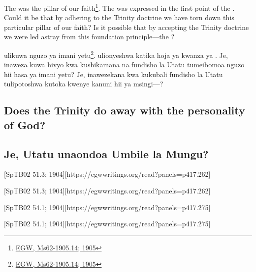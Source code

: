 The  was the pillar of our faith\footnote{\href{https://egwwritings.org/?ref=en_Ms62-1905.14}{EGW, Ms62-1905.14; 1905}}. The  was expressed in the first point of the . Could it be that by adhering to the Trinity doctrine we have torn down this particular pillar of our faith? Is it possible that by accepting the Trinity doctrine we were led astray from this foundation principle—the ?


 ulikuwa nguzo ya imani yetu\footnote{\href{https://egwwritings.org/?ref=en_Ms62-1905.14}{EGW, Ms62-1905.14; 1905}}.  ulionyeshwa katika hoja ya kwanza ya . Je, inaweza kuwa hivyo kwa kushikamana na fundisho la Utatu tumeibomoa nguzo hii hasa ya imani yetu? Je, inawezekana kwa kukubali fundisho la Utatu tulipotoshwa kutoka kwenye kanuni hii ya msingi—?


\subsection*{Does the Trinity do away with the personality of God?}


\subsection*{Je, Utatu unaondoa Umbile la Mungu?}


[SpTB02 51.3; 1904][https://egwwritings.org/read?panels=p417.262]


[SpTB02 51.3; 1904][https://egwwritings.org/read?panels=p417.262]


[SpTB02 54.1; 1904][https://egwwritings.org/read?panels=p417.275]


[SpTB02 54.1; 1904][https://egwwritings.org/read?panels=p417.275]


